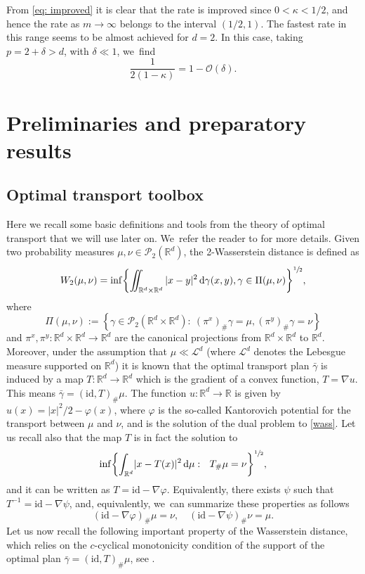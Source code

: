 \documentclass[11pt]{article}
\numberwithin{equation}{section}
\newcommand{\curlyL}{\mathcal{L}}
\newcommand{\curlyP}{\mathcal{P}}
\newcommand{\dx}[1]{\mathop{}\!\mathrm{d} #1}
\newcommand{\R}{\mathbb{R}}
\theoremstyle{plain}
\theoremstyle{remark}
\begin{document}
From \eqref{eq: improved} it is clear that the rate is improved since $0<{\kappa}<1/2$, and hence the rate as $m\to\infty$ belongs to the interval $(1/2, 1)$.
The fastest rate in this range seems to be almost achieved for $d=2$. In this case,
taking $p=2+\delta>d$, with $\delta\ll1$, we~find
\begin{equation*}
\frac{1}{2(1-\kappa)}= 1 - \mathcal{O}(\delta).
\end{equation*}

\section{Preliminaries and preparatory results}\label{sec: prelim}

\subsection{Optimal transport toolbox}

Here we recall some basic definitions and tools from the theory of optimal transport that we will use later on. We~refer the reader to \cite{OTAM,villaniOT} for more details.
Given two probability measures $\mu, \nu \in \curlyP_2(\R^d)$, the 2-Wasserstein distance is defined as
\begin{equation}\label{wass}
W_2(\mu, \nu) = \inf \biggl\{\iint_{\R^d\times\R^d} |x-y|^2 \dx \gamma(x,y), \gamma \in \Pi(\mu,\nu)\biggr\}^{\sfrac 12},
\end{equation}
where
\[
\Pi(\mu,\nu):=\left\{\gamma {\in\curlyP_2(\R^d\times\R^d)}:\ (\pi^x)_\#\gamma = \mu, (\pi^y)_\#\gamma = \nu \right\}
\]
and ${\pi^x, \pi^y:\R^d\times\R^d\to\R^d}$ are the canonical projections from $\R^d\times\R^d$ to $\R^d$. Moreover, under the assumption that $\mu\ll \curlyL^d$ (where $\curlyL^d$ denotes the Lebesgue measure {supported} on $\R^d$) it is known that the optimal transport plan $\bar\gamma$ is induced by a map $T:\R^d\to\R^d$ which is the gradient of a convex function, $T=\nabla u$. This means $\bar\gamma= (\mathrm{id}, T)_\#\mu$. The function $u:\R^d \to \R$ is given by $u(x)=|x|^2/2 -\varphi(x)$, where $\varphi$ is the so-called Kantorovich potential for the transport between $\mu$ and $\nu$, and is the solution of the dual problem to \eqref{wass}.
Let us recall also that the map $T$ is in fact the solution to
\begin{equation*}
\inf \biggl\{{\int_{\R^d}} |x-T(x)|^2 \dx \mu:\ \ T_\#\mu = \nu\biggr\}^{\sfrac 12},
\end{equation*}
and it can be written as $T=\mathrm{id} - \nabla \varphi$.
Equivalently, there exists $\psi$ such that $T^{-1}=\mathrm{id}-\nabla \psi$, and, equivalently, we~can summarize these properties as follows
\begin{equation*}
(\mathrm{id} - \nabla \varphi)_\#\mu = \nu, \quad (\mathrm{id} - \nabla \psi)_\#\nu = \mu.
\end{equation*}
Let us now recall the following important property of the Wasserstein distance, which relies on the $c$-cyclical monotonicity condition {of the support of the optimal plan $\bar\gamma = (\mathrm{id}, T)_\#\mu$}, see \cite{BJR2007}.
\end{document}
